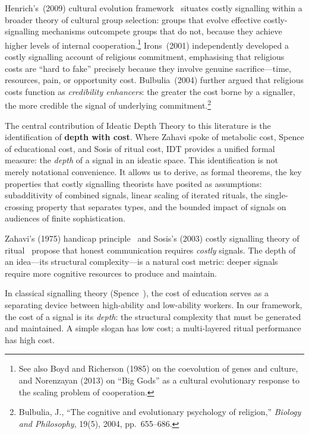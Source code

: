 Henrich's~(2009) cultural evolution framework~\cite{henrich2009}
situates costly signalling within a broader theory of cultural group
selection: groups that evolve effective costly-signalling mechanisms
outcompete groups that do not, because they achieve higher levels of
internal cooperation.\footnote{See also Boyd and Richerson (1985) on the
  coevolution of genes and culture, and Norenzayan (2013) on ``Big
  Gods'' as a cultural evolutionary response to the scaling problem of
  cooperation.}  Irons~(2001) independently developed a costly
signalling account of religious commitment, emphasising that religious
costs are ``hard to fake'' precisely because they involve genuine
sacrifice---time, resources, pain, or opportunity cost.  Bulbulia~(2004)
further argued that religious costs function as \emph{credibility
enhancers}: the greater the cost borne by a signaller, the more credible
the signal of underlying commitment.\footnote{Bulbulia, J., ``The
  cognitive and evolutionary psychology of religion,''
  \textit{Biology and Philosophy}, 19(5), 2004, pp.~655--686.}

The central contribution of Ideatic Depth Theory to this literature is
the identification of \textbf{depth with cost}.  Where Zahavi spoke of
metabolic cost, Spence of educational cost, and Sosis of ritual cost,
IDT provides a unified formal measure: the \emph{depth} of a signal in
an ideatic space.  This identification is not merely notational
convenience.  It allows us to derive, as formal theorems, the key
properties that costly signalling theorists have posited as assumptions:
subadditivity of combined signals, linear scaling of iterated rituals,
the single-crossing property that separates types, and the bounded
impact of signals on audiences of finite sophistication.

Zahavi's (1975) handicap principle~\cite{zahavi1975} and Sosis's (2003)
costly signalling theory of ritual~\cite{sosis2003} propose that honest
communication requires \emph{costly} signals.  The depth of an idea---its
structural complexity---is a natural cost metric: deeper signals require
more cognitive resources to produce and maintain.

In classical signalling theory (Spence~\cite{spence1973}), the cost of
education serves as a separating device between high-ability and
low-ability workers.  In our framework, the cost of a signal is its
\emph{depth}: the structural complexity that must be generated and
maintained.  A simple slogan has low cost; a multi-layered ritual
performance has high cost.

